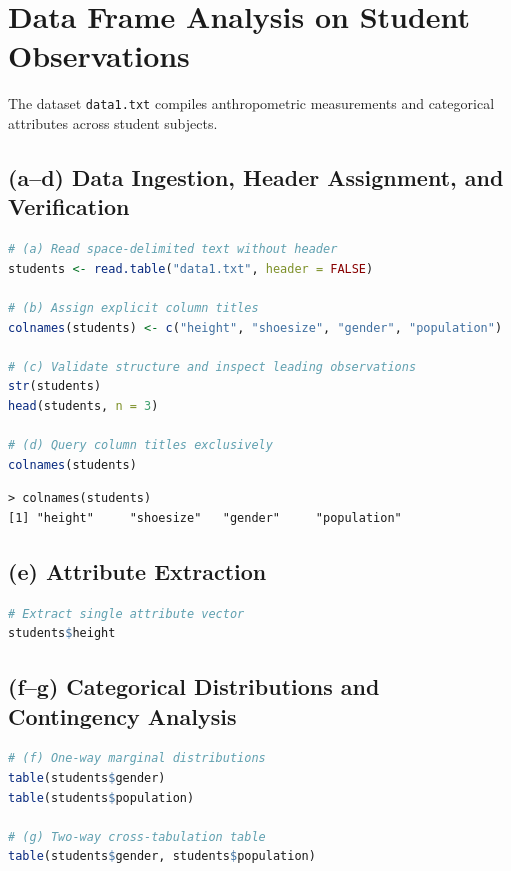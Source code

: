 \documentclass[11pt, a4paper]{article}
\begin{document}
\newpage

\section{Data Frame Analysis on Student Observations}
The dataset \texttt{data1.txt} compiles anthropometric measurements and categorical attributes across student subjects.

\subsection{(a--d) Data Ingestion, Header Assignment, and Verification}
\begin{lstlisting}[language=R]
# (a) Read space-delimited text without header
students <- read.table("data1.txt", header = FALSE)

# (b) Assign explicit column titles
colnames(students) <- c("height", "shoesize", "gender", "population")

# (c) Validate structure and inspect leading observations
str(students)
head(students, n = 3)

# (d) Query column titles exclusively
colnames(students)
\end{lstlisting}

\begin{lstlisting}
> colnames(students)
[1] "height"     "shoesize"   "gender"     "population"
\end{lstlisting}

\subsection{(e) Attribute Extraction}
\begin{lstlisting}[language=R]
# Extract single attribute vector
students$height
\end{lstlisting}

\subsection{(f--g) Categorical Distributions and Contingency Analysis}
\begin{lstlisting}[language=R]
# (f) One-way marginal distributions
table(students$gender)
table(students$population)

# (g) Two-way cross-tabulation table
table(students$gender, students$population)
\end{lstlisting}
\end{document}

